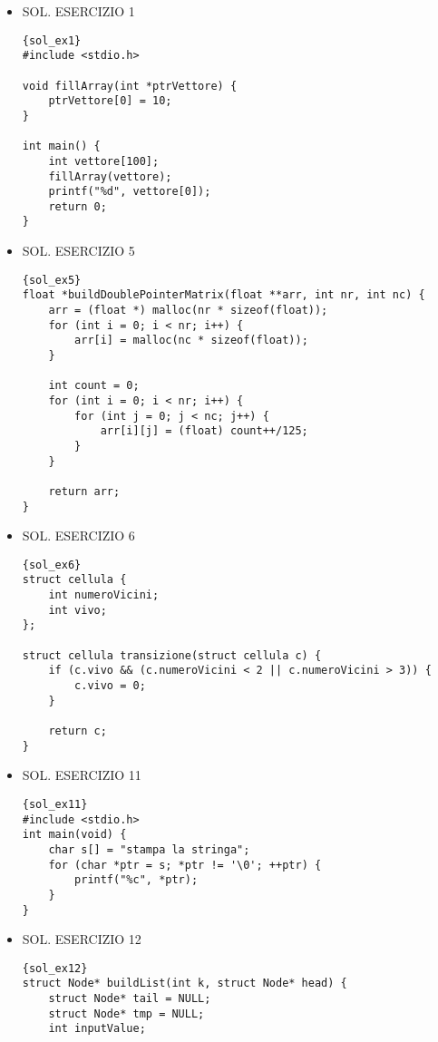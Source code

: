 \begin{itemize}
    \item [] SOL. ESERCIZIO 1
    \begin{lstlisting}{sol_ex1}
#include <stdio.h> 
  
void fillArray(int *ptrVettore) { 
    ptrVettore[0] = 10; 
} 
  
int main() {
    int vettore[100];  
    fillArray(vettore); 
    printf("%d", vettore[0]); 
    return 0; 
} 
\end{lstlisting}

    \item [] SOL. ESERCIZIO 5 
\begin{lstlisting}{sol_ex5}  
float *buildDoublePointerMatrix(float **arr, int nr, int nc) {
    arr = (float *) malloc(nr * sizeof(float));
    for (int i = 0; i < nr; i++) {
        arr[i] = malloc(nc * sizeof(float));
    }

    int count = 0;
    for (int i = 0; i < nr; i++) {
        for (int j = 0; j < nc; j++) {
            arr[i][j] = (float) count++/125;
        }
    }

    return arr;
}
\end{lstlisting}
    
    \item [] SOL. ESERCIZIO 6 
\begin{lstlisting}{sol_ex6}  
struct cellula {
    int numeroVicini;
    int vivo;
};

struct cellula transizione(struct cellula c) {
    if (c.vivo && (c.numeroVicini < 2 || c.numeroVicini > 3)) {
        c.vivo = 0;
    } 

    return c;
}
\end{lstlisting}


    \item [] SOL. ESERCIZIO 11 
\begin{lstlisting}{sol_ex11}  
#include <stdio.h>
int main(void) {
    char s[] = "stampa la stringa";
    for (char *ptr = s; *ptr != '\0'; ++ptr) {
        printf("%c", *ptr);
    }
}
\end{lstlisting}

\vspace{1.4cm}
    \item [] SOL. ESERCIZIO 12 
\begin{lstlisting}{sol_ex12}  
struct Node* buildList(int k, struct Node* head) {
    struct Node* tail = NULL; 
    struct Node* tmp = NULL; 
    int inputValue;


\end{lstlisting}
\end{itemize}
